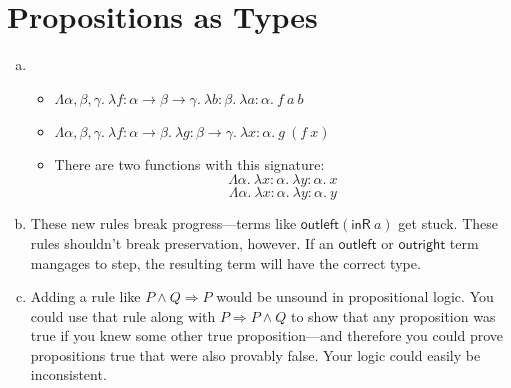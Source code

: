 \section{Propositions as Types}
\newcommand{\fun}[3]{\lambda {#1}\!:\!{#2}.~{#3}}
\newcommand{\Fun}[2]{\Lambda {#1}.~{#2}}

\begin{enumerate}[(a)]
    \item \begin{itemize}
        \item $\Fun{\alpha, \beta, \gamma}{\fun f {\alpha \rightarrow \beta \rightarrow \gamma} {\fun b \beta {\fun a \alpha {f~a~b}}}}$
        \item $\Fun{\alpha, \beta, \gamma}{\fun f {\alpha \rightarrow \beta} {\fun g {\beta \rightarrow \gamma} {\fun x \alpha {g~(f~x)}}}}$
        \item There are two functions with this signature:
            $$ \Fun \alpha {\fun x \alpha {\fun y \alpha x}} $$
            $$ \Fun \alpha {\fun x \alpha {\fun y \alpha y}} $$
    \end{itemize}
    \item These new rules break progress---terms like $\textsf{outleft} (\textsf{inR}~a)$ get stuck. These rules
    shouldn't break preservation, however. If an $\textsf{outleft}$ or $\textsf{outright}$ term mangages to step, the
    resulting term will have the correct type.
    \item Adding a rule like $P \wedge Q \Rightarrow P$ would be unsound in propositional logic. You could use that rule
    along with $P \Rightarrow P \wedge Q$ to show that any proposition was true if you knew some other true
    proposition---and therefore you could prove propositions true that were also provably false. Your logic could easily
    be inconsistent.
\end{enumerate}
